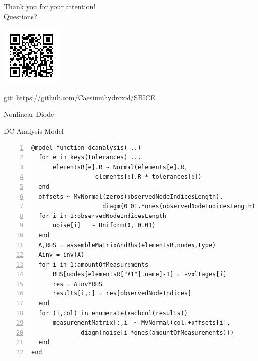 \documentclass{beamer}
\begin{document}
  \begin{frame}
    \begin{center}
      \Huge{Thank you for your attention! \\ Questions?}
      \begin{center}
        \includegraphics[width=.3\textwidth]{images/qrcode.png}
        
        \normalsize git: https://github.com/Caesiumhydroxid/SBICE
      \end{center}
      
    \end{center}
  \end{frame}

  \begin{frame}{Nonlinear Diode}
    
  \end{frame}


  \begin{frame}[fragile]{DC Analysis Model}
    \begin{lstlisting}[numbers=left]
@model function dcanalysis(...)
  for e in keys(tolerances) ...
      elementsR[e].R ~ Normal(elements[e].R, 
                  elements[e].R * tolerances[e]) 
  end
  offsets ~ MvNormal(zeros(observedNodeIndicesLength), 
                    diagm(0.01.*ones(observedNodeIndicesLength)))
  for i in 1:observedNodeIndicesLength
      noise[i]   ~ Uniform(0, 0.01)
  end
  A,RHS = assembleMatrixAndRhs(elementsR,nodes,type)
  Ainv = inv(A)
  for i in 1:amountOfMeasurements
      RHS[nodes[elementsR["V1"].name]-1] = -voltages[i]
      res = Ainv*RHS
      results[i,:] = res[observedNodeIndices] 
  end
  for (i,col) in enumerate(eachcol(results))
      measurementMatrix[:,i] ~ MvNormal(col.+offsets[i], 
              diagm(noise[i]*ones(amountOfMeasurements)))
  end
end
    \end{lstlisting}
  \end{frame}
\end{document}
